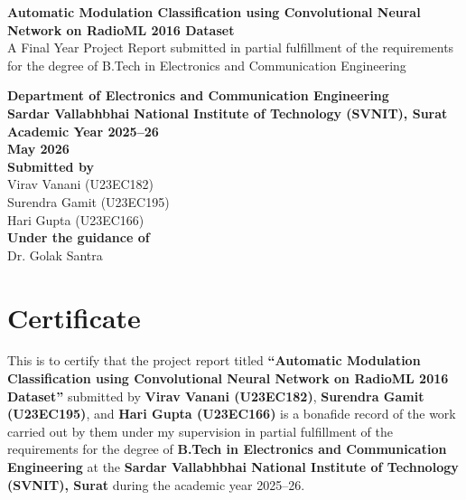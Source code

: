 \documentclass[12pt,a4paper]{report}
\begin{document}
\begin{titlepage}
    \centering
    \vspace*{1in}
    {\LARGE \textbf{Automatic Modulation Classification using Convolutional Neural Network on RadioML 2016 Dataset}\\[0.6cm]}
    {\large A Final Year Project Report submitted in partial fulfillment of the requirements for the degree of B.Tech in Electronics and Communication Engineering\\[1.2cm]}

    {\large \textbf{Department of Electronics and Communication Engineering}\\
    \textbf{Sardar Vallabhbhai National Institute of Technology (SVNIT), Surat}\\
    \textbf{Academic Year 2025--26}\\
    \textbf{May 2026}}\\[1.2cm]

    {\large \textbf{Submitted by}\\
    Virav Vanani (U23EC182)\\
    Surendra Gamit (U23EC195)\\
    Hari Gupta (U23EC166)}\\[1.2cm]

    {\large \textbf{Under the guidance of}\\
    Dr. Golak Santra}

    \vfill
\end{titlepage}

\setcounter{page}{1}

\chapter*{Certificate}
This is to certify that the project report titled \textbf{``Automatic Modulation Classification using Convolutional Neural Network on RadioML 2016 Dataset''} submitted by \textbf{Virav Vanani (U23EC182)}, \textbf{Surendra Gamit (U23EC195)}, and \textbf{Hari Gupta (U23EC166)} is a bonafide record of the work carried out by them under my supervision in partial fulfillment of the requirements for the degree of \textbf{B.Tech in Electronics and Communication Engineering} at the \textbf{Sardar Vallabhbhai National Institute of Technology (SVNIT), Surat} during the academic year 2025--26.
\end{document}
